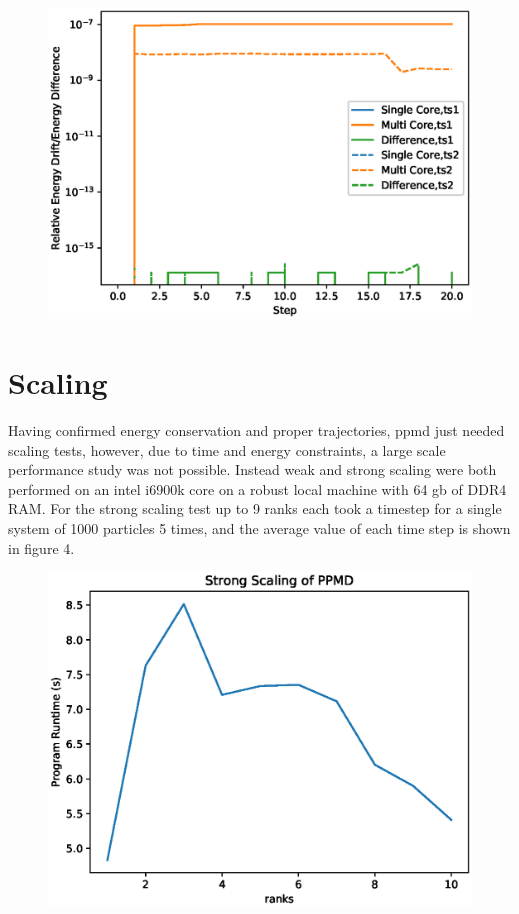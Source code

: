\documentclass[%
 reprint,
 amsmath,amssymb,
 aps,
pra,
prb,
rmp,
prstab,
prstper,
]{revtex4-1}
\begin{document}
\begin{figure}
	\centering
	\includegraphics[width=8cm\linewidth, height=8cm\textheight]{NbodyEnergy}
	\caption{}
	\label{fig:nbodyenergy}
\end{figure}


\section{\label{sec:level1}Scaling}

Having confirmed energy conservation and proper trajectories, ppmd just needed scaling
tests, however, due to time and energy constraints, a large scale performance study was
not possible. Instead weak and strong scaling were both performed on an intel i6900k 
core on a robust local machine with 64 gb of DDR4 RAM. For the strong scaling test up to 9 ranks each
took a timestep for a single system of 1000 particles 5 times, and the average value
of each time step is shown in figure 4.

\begin{figure}
	\centering
	\includegraphics[width=8cm\linewidth, height=8cm\textheight]{StrongScaling}
	\caption{}
	\label{fig:strongscaling}
\end{figure}
\end{document}
